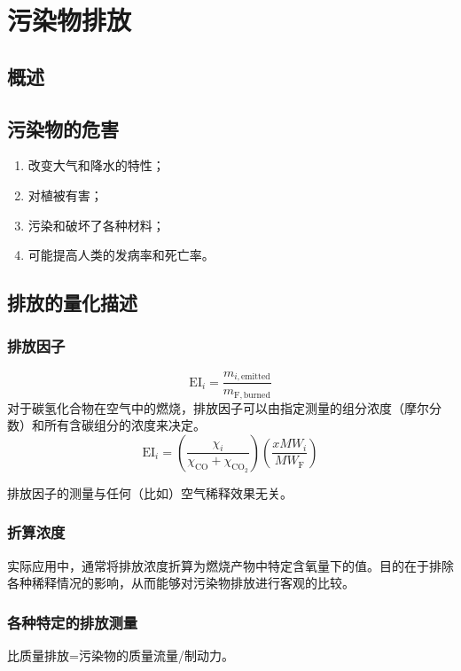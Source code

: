 \section{污染物排放}
\subsection{概述}
\subsection{污染物的危害}
\begin{enumerate}
    \item 改变大气和降水的特性；
    \item 对植被有害；
    \item 污染和破坏了各种材料；
    \item 可能提高人类的发病率和死亡率。
\end{enumerate}

\subsection{排放的量化描述}
\subsubsection{排放因子}
\begin{equation}
    \mathrm{EI}_i = \frac{m_{i,\mathrm{emitted}}}{m_{\mathrm{F,burned}}}
\end{equation}
对于碳氢化合物在空气中的燃烧，排放因子可以由指定测量的组分浓度（摩尔分数）和所有含碳组分的浓度来决定。
\begin{equation}
    \mathrm{EI}_i = \left(\frac{\chi_i}{\chi_\mathrm{CO} + \chi_\mathrm{CO_2}}\right)\left(\frac{x MW_i}{MW_\mathrm{F}}\right)
\end{equation}

排放因子的测量与任何（比如）空气稀释效果无关。

\subsubsection{折算浓度}
实际应用中，通常将排放浓度折算为燃烧产物中特定含氧量下的值。目的在于排除各种稀释情况的影响，从而能够对污染物排放进行客观的比较。

\subsubsection{各种特定的排放测量}
比质量排放=污染物的质量流量/制动力。

